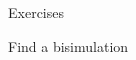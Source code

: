 \documentclass[aspectratio=169]{beamer}
\begin{document}
\begin{slide}{Exercises}
\begin{exampleblock}{\exercise Find a bisimulation}
\end{exampleblock}
\end{slide}
\end{document}
